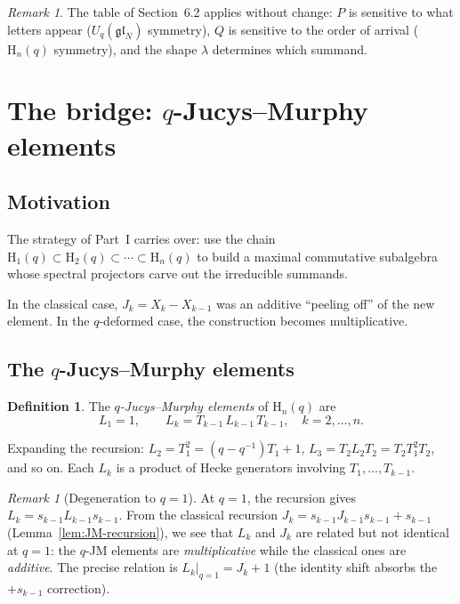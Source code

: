 \documentclass[12pt,a4paper]{article}
\theoremstyle{definition}
\newtheorem{definition}[theorem]{Definition}
\theoremstyle{remark}
\newtheorem{remark}[theorem]{Remark}
\newcommand{\gl}{\mathfrak{gl}}
\begin{document}
\begin{remark}
The table of Section~6.2 applies without change: $P$ is sensitive to
what letters appear ($U_q(\gl_N)$ symmetry), $Q$ is sensitive to
the order of arrival ($\mathrm{H}_n(q)$ symmetry), and the shape
$\lambda$ determines which summand.
\end{remark}

\section{The bridge: $q$-Jucys--Murphy elements}
\label{sec:q-bridge}

\subsection{Motivation}

The strategy of Part~I carries over: use the chain
$\mathrm{H}_1(q) \subset \mathrm{H}_2(q) \subset \cdots \subset
\mathrm{H}_n(q)$ to build a maximal commutative subalgebra whose
spectral projectors carve out the irreducible summands.

In the classical case, $J_k = X_k - X_{k-1}$ was an additive
``peeling off'' of the new element. In the $q$-deformed case, the
construction becomes multiplicative.

\subsection{The $q$-Jucys--Murphy elements}

\begin{definition}\label{def:q-JM}
The \emph{$q$-Jucys--Murphy elements} of $\mathrm{H}_n(q)$ are
\[
  L_1 = 1, \qquad
  L_k = T_{k-1}\, L_{k-1}\, T_{k-1},
  \quad k = 2, \ldots, n.
\]
\end{definition}

Expanding the recursion: $L_2 = T_1^2 = (q - q^{-1}) T_1 + 1$,
$L_3 = T_2 L_2 T_2 = T_2 T_1^2 T_2$, and so on. Each $L_k$ is a
product of Hecke generators involving $T_1, \ldots, T_{k-1}$.

\begin{remark}[Degeneration to $q = 1$]
At $q = 1$, the recursion gives $L_k = s_{k-1} L_{k-1} s_{k-1}$. From
the classical recursion $J_k = s_{k-1} J_{k-1} s_{k-1} + s_{k-1}$
(Lemma~\ref{lem:JM-recursion}), we see that $L_k$ and $J_k$ are
related but not identical at $q = 1$: the $q$-JM elements are
\emph{multiplicative} while the classical ones are \emph{additive}.
The precise relation is $L_k|_{q=1} = J_k + 1$ (the identity shift
absorbs the $+s_{k-1}$ correction).
\end{remark}
\end{document}
